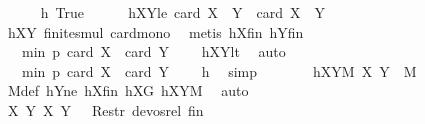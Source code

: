 \begin{isabellebody}
\ \ \ \ \isamarkupfalse%
\ h{\isacharcolon}{\kern0pt}\ True\isanewline
\ \ \ \ \isamarkupfalse%
\ hXY{}le{\isacharcolon}{\kern0pt}\ {\isachardoublequoteopen}card\ {\isacharparenleft}{\kern0pt}{\isacharquery}{\kern0pt}X{}\ {\isasymcdots}\ {\isacharquery}{\kern0pt}Y{}{\isacharparenright}{\kern0pt}\ {\isasymle}\ card\ {\isacharparenleft}{\kern0pt}X\ {\isasymcdots}\ Y{\isacharparenright}{\kern0pt}{\isachardoublequoteclose}\ \isamarkupfalse%
\ hXY{}\ finite{\isacharunderscore}{\kern0pt}smul\ card{\isacharunderscore}{\kern0pt}mono\ \isamarkupfalse%
\ {\isacharparenleft}{\kern0pt}metis\ hXfin\ hYfin{\isacharparenright}{\kern0pt}\isanewline
\ \ \ \ \isamarkupfalse%
\ \isamarkupfalse%
\ {\isachardoublequoteopen}{\isachardot}{\kern0pt}{\isachardot}{\kern0pt}{\isachardot}{\kern0pt}\ {\isacharless}{\kern0pt}\ min\ p\ {\isacharparenleft}{\kern0pt}card\ X\ {\isacharplus}{\kern0pt}\ card\ Y\ {\isacharminus}{\kern0pt}\ {}{\isacharparenright}{\kern0pt}{\isachardoublequoteclose}\ \isamarkupfalse%
\ hXYlt\ \isamarkupfalse%
\ auto\isanewline
\ \ \ \ \isamarkupfalse%
\ \isamarkupfalse%
\ {\isachardoublequoteopen}{\isachardot}{\kern0pt}{\isachardot}{\kern0pt}{\isachardot}{\kern0pt}\ {\isasymle}\ min\ p\ {\isacharparenleft}{\kern0pt}card\ {\isacharquery}{\kern0pt}X{}\ {\isacharplus}{\kern0pt}\ card\ {\isacharquery}{\kern0pt}Y{}\ {\isacharminus}{\kern0pt}\ {}{\isacharparenright}{\kern0pt}{\isachardoublequoteclose}\ \isamarkupfalse%
\ h\ \isamarkupfalse%
\ simp\isanewline
\ \ \ \ \isamarkupfalse%
\ \isamarkupfalse%
\ hXY{}M{\isacharcolon}{\kern0pt}\ {\isachardoublequoteopen}{\isacharparenleft}{\kern0pt}{\isacharquery}{\kern0pt}X{}{\isacharcomma}{\kern0pt}\ {\isacharquery}{\kern0pt}Y{}{\isacharparenright}{\kern0pt}\ {\isasymin}\ M{\isachardoublequoteclose}\ \isamarkupfalse%
\ M{\isacharunderscore}{\kern0pt}def\ hY{}ne\ hX{}fin\ hX{}G\ hXYM\ \isamarkupfalse%
\ auto\isanewline
\ \ \ \ \isamarkupfalse%
\ \isamarkupfalse%
\ {\isachardoublequoteopen}{\isacharparenleft}{\kern0pt}{\isacharparenleft}{\kern0pt}{\isacharquery}{\kern0pt}X{}{\isacharcomma}{\kern0pt}\ {\isacharquery}{\kern0pt}Y{}{\isacharparenright}{\kern0pt}{\isacharcomma}{\kern0pt}\ {\isacharparenleft}{\kern0pt}X{\isacharcomma}{\kern0pt}\ Y{\isacharparenright}{\kern0pt}{\isacharparenright}{\kern0pt}\ {\isasymin}\ \ Restr\ devos{\isacharunderscore}{\kern0pt}rel\ {\isacharquery}{\kern0pt}fin{\isachardoublequoteclose}\ \isamarkupfalse%

\end{isabellebody}
